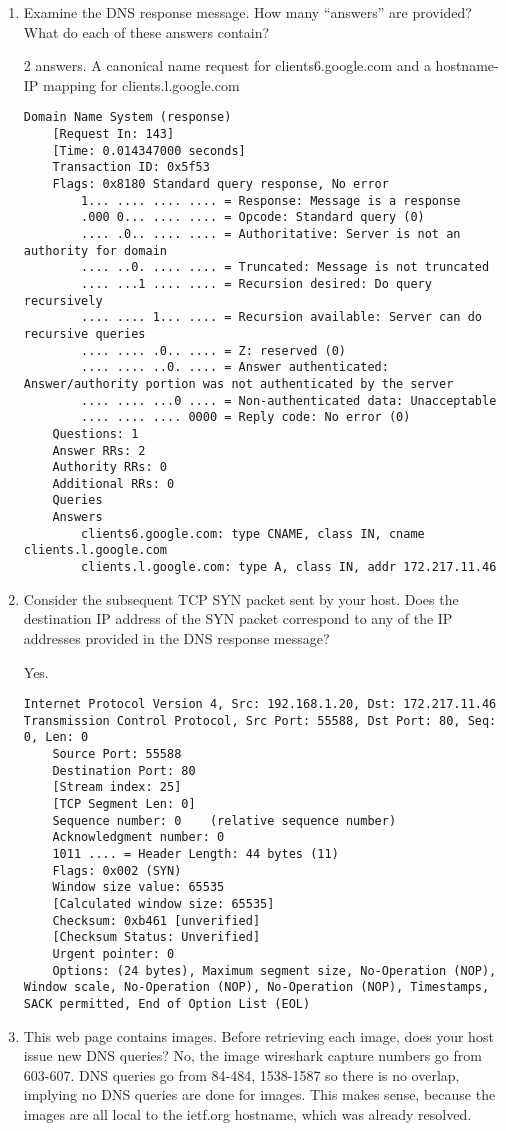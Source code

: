 \documentclass[letter,10pt]{article}
\begin{document}
\begin{enumerate}
\item Examine the DNS response message. How many “answers” are provided? What
do each of these answers contain?

2 answers. A canonical name request for clients6.google.com and a hostname-IP mapping for clients.l.google.com

\begin{verbatim}
Domain Name System (response)
    [Request In: 143]
    [Time: 0.014347000 seconds]
    Transaction ID: 0x5f53
    Flags: 0x8180 Standard query response, No error
        1... .... .... .... = Response: Message is a response
        .000 0... .... .... = Opcode: Standard query (0)
        .... .0.. .... .... = Authoritative: Server is not an authority for domain
        .... ..0. .... .... = Truncated: Message is not truncated
        .... ...1 .... .... = Recursion desired: Do query recursively
        .... .... 1... .... = Recursion available: Server can do recursive queries
        .... .... .0.. .... = Z: reserved (0)
        .... .... ..0. .... = Answer authenticated: Answer/authority portion was not authenticated by the server
        .... .... ...0 .... = Non-authenticated data: Unacceptable
        .... .... .... 0000 = Reply code: No error (0)
    Questions: 1
    Answer RRs: 2
    Authority RRs: 0
    Additional RRs: 0
    Queries
    Answers
        clients6.google.com: type CNAME, class IN, cname clients.l.google.com
        clients.l.google.com: type A, class IN, addr 172.217.11.46
\end{verbatim}

\item Consider the subsequent TCP SYN packet sent by your host. Does the destination
IP address of the SYN packet correspond to any of the IP addresses provided in
the DNS response message?

Yes.

\begin{verbatim}
Internet Protocol Version 4, Src: 192.168.1.20, Dst: 172.217.11.46
Transmission Control Protocol, Src Port: 55588, Dst Port: 80, Seq: 0, Len: 0
    Source Port: 55588
    Destination Port: 80
    [Stream index: 25]
    [TCP Segment Len: 0]
    Sequence number: 0    (relative sequence number)
    Acknowledgment number: 0
    1011 .... = Header Length: 44 bytes (11)
    Flags: 0x002 (SYN)
    Window size value: 65535
    [Calculated window size: 65535]
    Checksum: 0xb461 [unverified]
    [Checksum Status: Unverified]
    Urgent pointer: 0
    Options: (24 bytes), Maximum segment size, No-Operation (NOP), Window scale, No-Operation (NOP), No-Operation (NOP), Timestamps, SACK permitted, End of Option List (EOL)

\end{verbatim}

\item This web page contains images. Before retrieving each image, does your host
issue new DNS queries? 
No, the image wireshark capture numbers go from 603-607. DNS queries go from 84-484, 1538-1587 so there is no overlap, implying no DNS queries are done for images. This makes sense, because the images are all local to the ietf.org hostname, which was already resolved.

\end{enumerate}
\end{document}
